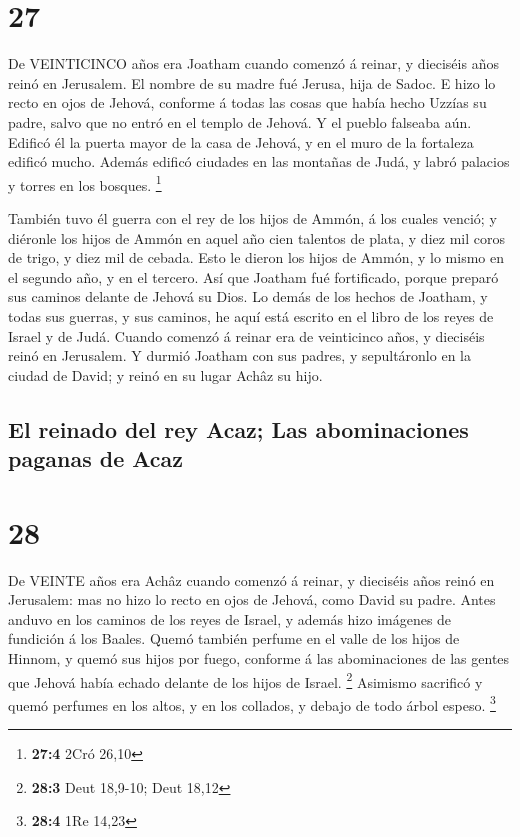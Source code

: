\hypertarget{section-26}{%
\section{27}\label{section-26}}

 De VEINTICINCO años era Joatham cuando comenzó á reinar, y
dieciséis años reinó en Jerusalem. El nombre de su madre fué Jerusa,
hija de Sadoc.  E hizo lo recto en ojos de Jehová, conforme
á todas las cosas que había hecho Uzzías su padre, salvo que no entró en
el templo de Jehová. Y el pueblo falseaba aún.  Edificó él
la puerta mayor de la casa de Jehová, y en el muro de la fortaleza
edificó mucho.  Además edificó ciudades en las montañas de
Judá, y labró palacios y torres en los bosques. \footnote{\textbf{27:4}
  2Cró 26,10}

 También tuvo él guerra con el rey de los hijos de Ammón, á
los cuales venció; y diéronle los hijos de Ammón en aquel año cien
talentos de plata, y diez mil coros de trigo, y diez mil de cebada. Esto
le dieron los hijos de Ammón, y lo mismo en el segundo año, y en el
tercero.  Así que Joatham fué fortificado, porque preparó
sus caminos delante de Jehová su Dios.  Lo demás de los
hechos de Joatham, y todas sus guerras, y sus caminos, he aquí está
escrito en el libro de los reyes de Israel y de Judá. 
Cuando comenzó á reinar era de veinticinco años, y dieciséis reinó en
Jerusalem.  Y durmió Joatham con sus padres, y sepultáronlo
en la ciudad de David; y reinó en su lugar Achâz su hijo.

\hypertarget{el-reinado-del-rey-acaz-las-abominaciones-paganas-de-acaz}{%
\subsection{El reinado del rey Acaz; Las abominaciones paganas de
Acaz}\label{el-reinado-del-rey-acaz-las-abominaciones-paganas-de-acaz}}

\hypertarget{section-27}{%
\section{28}\label{section-27}}

 De VEINTE años era Achâz cuando comenzó á reinar, y
dieciséis años reinó en Jerusalem: mas no hizo lo recto en ojos de
Jehová, como David su padre.  Antes anduvo en los caminos de
los reyes de Israel, y además hizo imágenes de fundición á los Baales.
 Quemó también perfume en el valle de los hijos de Hinnom, y
quemó sus hijos por fuego, conforme á las abominaciones de las gentes
que Jehová había echado delante de los hijos de Israel. \footnote{\textbf{28:3}
  Deut 18,9-10; Deut 18,12}  Asimismo sacrificó y quemó
perfumes en los altos, y en los collados, y debajo de todo árbol espeso.
\footnote{\textbf{28:4} 1Re 14,23}

